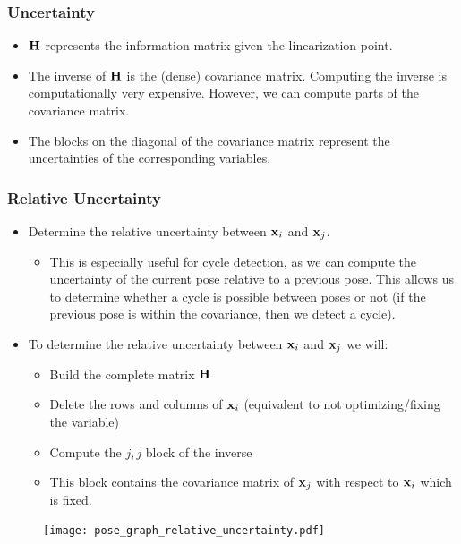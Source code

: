 \begin{frame}
    \frametitle{Uncertainty}
    
    \begin{itemize}
    \item $\boldsymbol{\mathbf{H}}$ represents the information matrix given the linearization point.
    \item The inverse of $\boldsymbol{\mathbf{H}}$ is the (dense) covariance matrix. Computing the inverse is computationally very expensive. However, we can compute parts of the covariance matrix.
    \item The blocks on the diagonal of the covariance matrix represent the uncertainties of the corresponding variables.
    \end{itemize}
    \end{frame}
    
    \begin{frame}
    \frametitle{Relative Uncertainty}
    \begin{itemize}
    \item Determine the relative uncertainty between $\boldsymbol{\mathbf{x}}_{i}$ and $\boldsymbol{\mathbf{x}}_{j}$.
    
    \begin{itemize}
    \item This is especially useful for cycle detection, as we can compute the uncertainty of the current pose relative to a previous pose. This allows us to determine whether a cycle is possible between poses or not (if the previous pose is within the covariance, then we detect a cycle).
    \end{itemize}
    
    \item To determine the relative uncertainty between $\boldsymbol{\mathbf{x}}_{i}$ and $\boldsymbol{\mathbf{x}}_{j}$ we will:
    \begin{itemize}
    \item Build the complete matrix $\boldsymbol{\mathbf{H}}$
    \item Delete the rows and columns of $\boldsymbol{\mathbf{x}}_{i}$ (equivalent to not optimizing/fixing the variable)
    \item Compute the $j,j$ block of the inverse
    \item This block contains the covariance matrix of $\boldsymbol{\mathbf{x}}_{j}$ with respect to $\boldsymbol{\mathbf{x}}_{i}$ which is fixed.
    
    \end{itemize}
    \end{itemize}
    
    \begin{figure}[!h]
    \texttt{[image: pose\_graph\_relative\_uncertainty.pdf]}
    \end{figure}
    
    \end{frame}
    
